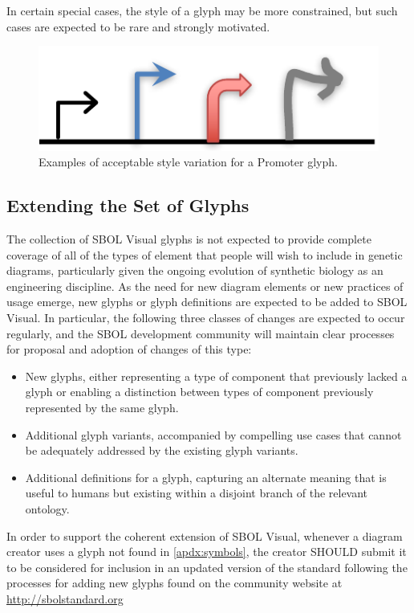 In certain special cases, the style of a glyph may be more constrained, but such cases are expected to be rare and strongly motivated.

\begin{figure}[h!]
\centering
\includegraphics[scale=1.0]{figures/style-variation.pdf}
\caption{Examples of acceptable style variation for a Promoter glyph.}
\label{f:stylevariation}
\end{figure}


\subsection{Extending the Set of Glyphs}\label{sec:extension}
The collection of SBOL Visual glyphs is not expected to provide
complete coverage of all of the types of element that people will
wish to include in genetic diagrams, particularly given the ongoing
evolution of synthetic biology as an engineering discipline.
%
As the need for new diagram elements or new practices of usage emerge,
new glyphs or glyph definitions are expected to be added to SBOL
Visual.
%
In particular, the following three classes of changes are expected to occur regularly,
and the SBOL development community will maintain clear processes for
proposal and adoption of changes of this type:
\begin{itemize}
\item New glyphs, either representing a type of component that
  previously lacked a glyph or enabling a distinction between types of
  component previously represented by the same glyph.
\item Additional glyph variants, accompanied by compelling use cases
  that cannot be adequately addressed by the existing glyph variants.
\item Additional definitions for a glyph, capturing an alternate
  meaning that is useful to humans but existing within a disjoint
  branch of the relevant ontology.
\end{itemize}

In order to support the coherent extension of SBOL Visual, 
whenever a diagram creator uses a glyph not found in \ref{apdx:symbols}, 
the creator SHOULD submit it to be considered for inclusion in an updated version of the standard following the processes for adding new glyphs found on the community website at \url{http://sbolstandard.org}



